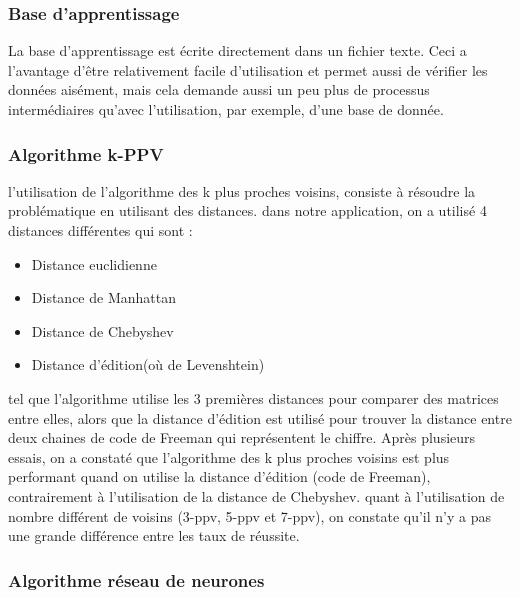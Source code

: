 \documentclass[10pt,a4paper]{report}
\begin{document}
\subsubsection{Base d'apprentissage}
La base d'apprentissage est écrite directement dans un fichier texte. Ceci a l'avantage d'être relativement facile d'utilisation et permet aussi de vérifier les données aisément, mais cela demande aussi un peu plus de processus intermédiaires qu'avec l'utilisation, par exemple, d'une base de donnée.

\subsubsection{Algorithme k-PPV}
l'utilisation de l'algorithme des k plus proches voisins, consiste à résoudre la problématique en utilisant des distances.
dans notre application, on a utilisé 4 distances différentes qui sont : 
\begin{itemize}[label=$-$,leftmargin=*,parsep=0cm,itemsep=0cm,topsep=0cm]
\item Distance euclidienne
\item Distance de Manhattan 
\item Distance de Chebyshev
\item Distance d'édition(où de Levenshtein)
\end{itemize}
tel que l'algorithme utilise les 3 premières distances pour comparer des matrices entre elles, alors que la distance d'édition est utilisé pour trouver la distance entre deux chaines de code de Freeman qui représentent le chiffre.
Après plusieurs essais, on a constaté que l'algorithme des k plus proches voisins est plus performant quand on utilise la distance d'édition (code de Freeman), contrairement à l'utilisation de la distance de Chebyshev.
quant à l'utilisation de nombre différent de voisins (3-ppv, 5-ppv et 7-ppv), on constate qu'il n'y a pas une grande différence entre les taux de réussite.

\subsubsection{Algorithme réseau de neurones}
\end{document}
